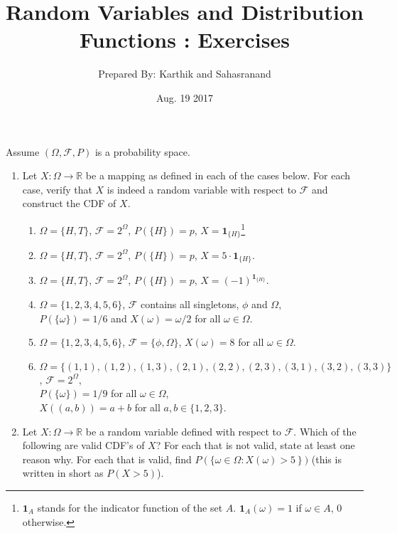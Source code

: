 \documentclass[11pt]{article}
\title {\sc Random Variables and Distribution Functions : Exercises}
\date{Aug. 19 2017}
\author{Prepared By: Karthik and Sahasranand}
\begin{document}
\maketitle 
\pagestyle{fancy}

Assume $(\Omega,\mathcal{F},P)$ is a probability space.
\begin{enumerate}
\item Let $X:\Omega \rightarrow \mathbb{R}$ be a mapping as defined in each of the cases below. For each case, verify that $X$ is indeed a random variable with respect to $\mathcal{F}$ and construct the CDF of $X$.
\begin{enumerate}
	\item $\Omega=\{H,T\}$, $\mathcal{F}=2^{\Omega}$, $P(\{H\})=p$, $X=\mathbf{1}_{\{H\}}$\footnote[2]{$\mathbf{1}_{A}$ stands for the indicator function of the set $A$. $\mathbf{1}_{A}(\omega) = 1$ if $\omega \in A$, $0$ otherwise.}
	\item $\Omega=\{H,T\}$, $\mathcal{F}=2^{\Omega}$, $P(\{H\})=p$, $X= 5 \cdot \mathbf{1}_{\{H\}}$.
	\item $\Omega=\{H,T\}$, $\mathcal{F}=2^{\Omega}$, $P(\{H\})=p$, $X= (-1)^{\mathbf{1}_{\{H\}}}$.
	\item $\Omega = \{1,2,3,4,5,6\}$, $\mathcal{F}$ contains all singletons, $\phi$ and $\Omega$, \\$P(\{\omega\})=1/6$ and $X(\omega)= \omega/2$ for all $\omega \in \Omega$.
	\item $\Omega = \{1,2,3,4,5,6\}$, $\mathcal{F}=\{\phi,\Omega\}$, $X(\omega)= 8$ for all $\omega \in \Omega$.
	\item $\Omega = \{(1,1),(1,2),(1,3),(2,1),(2,2),(2,3),(3,1),(3,2),(3,3)\}$, $\mathcal{F}=2^{\Omega}$, \\$P(\{\omega\})=1/9$ for all $\omega \in \Omega$, \\$X((a,b)) =  a+b$ for all $a,b \in \{1,2,3\}$.
\end{enumerate}
\item Let $X:\Omega\to \mathbb{R}$ be a random variable defined with respect to $\mathcal{F}$. Which of the following are
valid CDF’s of $X$? For each that is not valid, state at least one reason why. For each
that is valid, find $P\left(\{\omega\in \Omega:X(\omega)>5\right\})$ (this is written in short as $P(X>5)$).
\end{enumerate}
\end{document}
